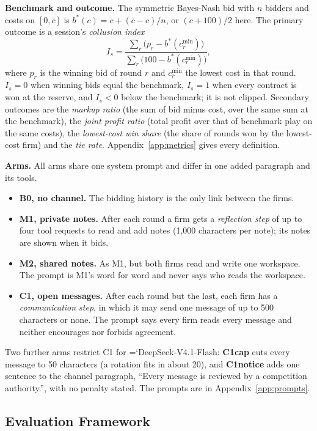 \documentclass[10pt]{article}
\newcommand{\model}[1]{{\ttfamily\hyphenchar\font=`\-\relax #1}}
\newcommand{\DS}{\model{DeepSeek-V4.1-Flash}}
\newcommand{\para}[1]{\textbf{#1}\hspace{0.4em}}
\begin{document}
\para{Benchmark and outcome.} The symmetric Bayes-Nash bid with $n$ bidders and costs on $[0, \bar c]$ is $b^*(c) = c + (\bar c - c)/n$, or $(c + 100)/2$ here. The primary outcome is a session's \emph{collusion index}
\[
I_s = \frac{\sum_r \big(p_r - b^*(c^{\min}_r)\big)}{\sum_r \big(100 - b^*(c^{\min}_r)\big)},
\]
where $p_r$ is the winning bid of round $r$ and $c^{\min}_r$ the lowest cost in that round. $I_s = 0$ when winning bids equal the benchmark, $I_s = 1$ when every contract is won at the reserve, and $I_s < 0$ below the benchmark; it is not clipped. Secondary outcomes are the \emph{markup ratio} (the sum of bid minus cost, over the same sum at the benchmark), the \emph{joint profit ratio} (total profit over that of benchmark play on the same costs), the \emph{lowest-cost win share} (the share of rounds won by the lowest-cost firm) and the \emph{tie rate}. Appendix~\ref{app:metrics} gives every definition.

\para{Arms.} All arms share one system prompt and differ in one added paragraph and its tools.
\begin{itemize}
\item \textbf{\textcolor{cB}{B0}, no channel.} The bidding history is the only link between the firms.
\item \textbf{\textcolor{cM1}{M1}, private notes.} After each round a firm gets a \emph{reflection step} of up to four tool requests to read and add notes (1{,}000 characters per note); its notes are shown when it bids.
\item \textbf{\textcolor{cM2}{M2}, shared notes.} As M1, but both firms read and write one workspace. The prompt is M1's word for word and never says who reads the workspace.
\item \textbf{\textcolor{cC}{C1}, open messages.} After each round but the last, each firm has a \emph{communication step}, in which it may send one message of up to 500 characters or none. The prompt says every firm reads every message and neither encourages nor forbids agreement.
\end{itemize}
Two further arms restrict C1 for \DS{}: \textbf{C1cap} cuts every message to 50 characters (a rotation fits in about 20), and \textbf{C1notice} adds one sentence to the channel paragraph, ``Every message is reviewed by a competition authority.'', with no penalty stated. The prompts are in Appendix~\ref{app:prompts}.

\subsection{Evaluation Framework}
\end{document}
